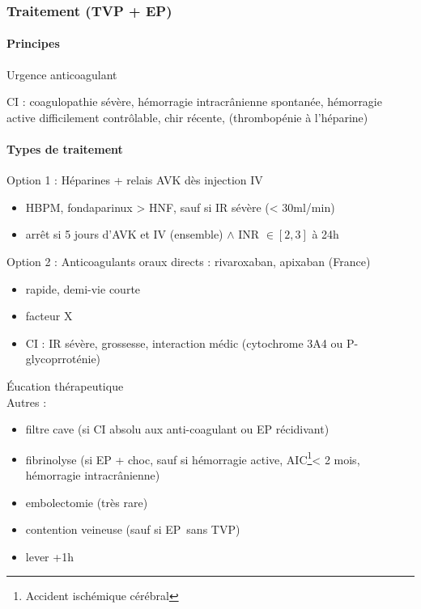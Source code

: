 \documentclass[11pt]{article}
\begin{document}
\subsubsection{Traitement (TVP + EP)}
\label{sec:orgb70c23a}
\paragraph{Principes}
\label{sec:orgdf4cab3}
Urgence  \thus anticoagulant

CI : coagulopathie sévère, hémorragie intracrânienne spontanée, hémorragie
active difficilement contrôlable, chir récente, (thrombopénie à l'héparine)

\paragraph{Types de traitement}
\label{sec:orge82a236}
Option 1 : Héparines + relais AVK dès injection IV

\begin{itemize}
\item HBPM, fondaparinux > HNF, sauf si IR sévère (< 30ml/min)
\item arrêt si 5 jours d'AVK et IV (ensemble) \(\wedge\) INR \(\in [2,3]\) à 24h
\end{itemize}

Option 2 : Anticoagulants oraux directs : rivaroxaban, apixaban (France)

\begin{itemize}
\item rapide, demi-vie courte
\item facteur X
\item CI : IR sévère, grossesse, interaction médic (cytochrome 3A4 ou
P-glycoprroténie)
\end{itemize}

Éucation thérapeutique\\
Autres :

\begin{itemize}
\item filtre cave (si CI absolu aux anti-coagulant ou EP récidivant)
\item fibrinolyse (si EP + choc, sauf si hémorragie active,
AIC\footnote{Accident ischémique cérébral}< 2 mois,
hémorragie intracrânienne)
\item embolectomie (très rare)
\item contention veineuse (sauf si EP sans TVP)
\item lever +1h
\end{itemize}
\end{document}
